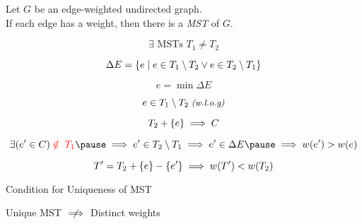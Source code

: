 
\begin{frame}{}
  \begin{theorem}
    Let $G$ be an edge-weighted undirected graph. \\
    If each edge has a  weight,
    then there is a  {\it MST} of $G$.
  \end{theorem}

  \pause
  \vspace{0.50cm}
  \centerline{}

  \pause
  \[
    \exists \text{ MSTs } T_1 \neq T_2
  \]

  \pause
  \[
    \Delta E = \{e \mid e \in T_1 \setminus T_2 \lor e \in T_2 \setminus T_1\}
  \]

  \pause
  \[
    e = \min \Delta E
  \]

  \pause
  \[
    e \in T_1 \setminus T_2 \;\text{\small \it (w.l.o.g)}
  \]
\end{frame}

\begin{frame}{}

  \pause
  \vspace{-0.30cm}
  \[
    T_2 + \{e\} \implies C
  \]

  \pause
  \vspace{-0.30cm}
  \[
    \exists (e' \in C) \red{\;\notin\; T_1} \pause \implies e' \in T_{2} \setminus T_{1} \implies e' \in \Delta E \pause \implies w(e') > w(e)
  \]

  \pause
  \vspace{-0.50cm}
  \[
    T' = T_{2} + \{e\} - \{e'\} \implies w(T') < w(T_{2})
  \]
\end{frame}

\begin{frame}{}
  \begin{exampleblock}{Condition for Uniqueness of MST}
    \centerline{Unique MST $\centernot\implies$ Distinct weights}
  \end{exampleblock}

  \pause
\end{frame}
